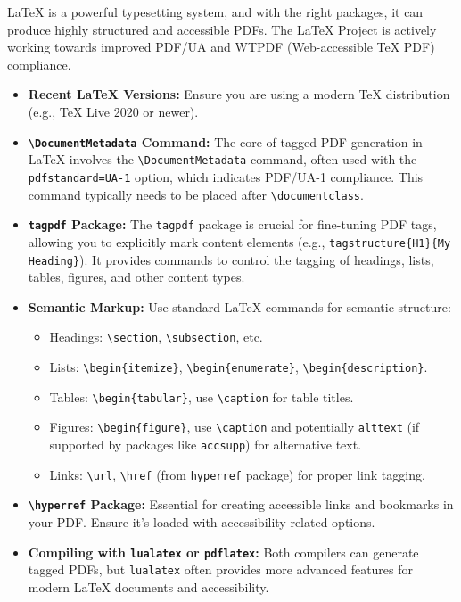 LaTeX is a powerful typesetting system, and with the right packages, it can produce highly structured and accessible PDFs. The LaTeX Project is actively working towards improved PDF/UA and WTPDF (Web-accessible TeX PDF) compliance. \cite{LaTeXTaggedPDF}

\begin{itemize}
\item \textbf{Recent LaTeX Versions:} Ensure you are using a modern TeX distribution (e.g., TeX Live 2020 or newer).

\item \textbf{\texttt{\textbackslash{}DocumentMetadata} Command:} The core of tagged PDF generation in LaTeX involves the \texttt{\textbackslash{}DocumentMetadata} command, often used with the \texttt{pdfstandard=UA-1} option, which indicates PDF/UA-1 compliance. This command typically needs to be placed after \texttt{\textbackslash{}documentclass}. \cite{LaTeXAccessBlog}

\item \textbf{\texttt{tagpdf} Package:} The \texttt{tagpdf} package is crucial for fine-tuning PDF tags, allowing you to explicitly mark content elements (e.g., \texttt{tagstructure\{H1\}\{My Heading\}}). It provides commands to control the tagging of headings, lists, tables, figures, and other content types.

\item \textbf{Semantic Markup:} Use standard LaTeX commands for semantic structure:

\begin{itemize}
\item Headings: \texttt{\textbackslash{}section}, \texttt{\textbackslash{}subsection}, etc.
\item Lists: \texttt{\textbackslash{}begin\{itemize\}}, \texttt{\textbackslash{}begin\{enumerate\}}, \texttt{\textbackslash{}begin\{description\}}.
\item Tables: \texttt{\textbackslash{}begin\{tabular\}}, use \texttt{\textbackslash{}caption} for table titles.
\item Figures: \texttt{\textbackslash{}begin\{figure\}}, use \texttt{\textbackslash{}caption} and potentially \texttt{alttext} (if supported by packages like \texttt{accsupp}) for alternative text.
\item Links: \texttt{\textbackslash{}url}, \texttt{\textbackslash{}href} (from \texttt{hyperref} package) for proper link tagging.
\end{itemize}

\item \textbf{\texttt{\textbackslash{}hyperref} Package:} Essential for creating accessible links and bookmarks in your PDF. Ensure it's loaded with accessibility-related options.

\item \textbf{Compiling with \texttt{lualatex} or \texttt{pdflatex}:} Both compilers can generate tagged PDFs, but \texttt{lualatex} often provides more advanced features for modern LaTeX documents and accessibility.
\end{itemize}

